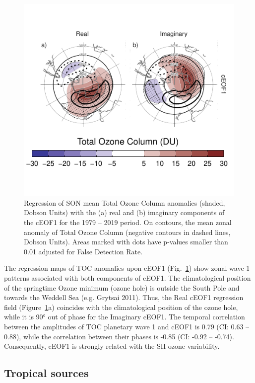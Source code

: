 \documentclass[smallextended]{svjour3}       %
\begin{document}
\begin{figure}
\centering
\includegraphics{../figures/o3-regr-1.pdf}
\caption{\label{fig:o3-regr}Regression of SON mean Total Ozone Column anomalies (shaded, Dobson Units) with the (a) real and (b) imaginary components of the cEOF1 for the 1979 -- 2019 period. On contours, the mean zonal anomaly of Total Ozone Column (negative contours in dashed lines, Dobson Units). Areas marked with dots have p-values smaller than 0.01 adjusted for False Detection Rate.}
\end{figure}

The regression maps of TOC anomalies upon cEOF1 (Fig.~\ref{fig:o3-regr}) show zonal wave 1 patterns associated with both components of cEOF1.
The climatological position of the springtime Ozone minimum (ozone hole) is outside the South Pole and towards the Weddell Sea (e.g. Grytsai 2011).
Thus, the Real cEOF1 regression field (Figure~\ref{fig:o3-regr}a) coincides with the climatological position of the ozone hole, while it is 90° out of phase for the Imaginary cEOF1.
The temporal correlation between the amplitudes of TOC planetary wave 1 and cEOF1 is 0.79 (CI: 0.63 -- 0.88), while the correlation between their phases is -0.85 (CI: -0.92 -- -0.74).
Consequently, cEOF1 is strongly related with the SH ozone variability.



\hypertarget{tropical}{%
\subsection{Tropical sources}\label{tropical}}
\end{document}
